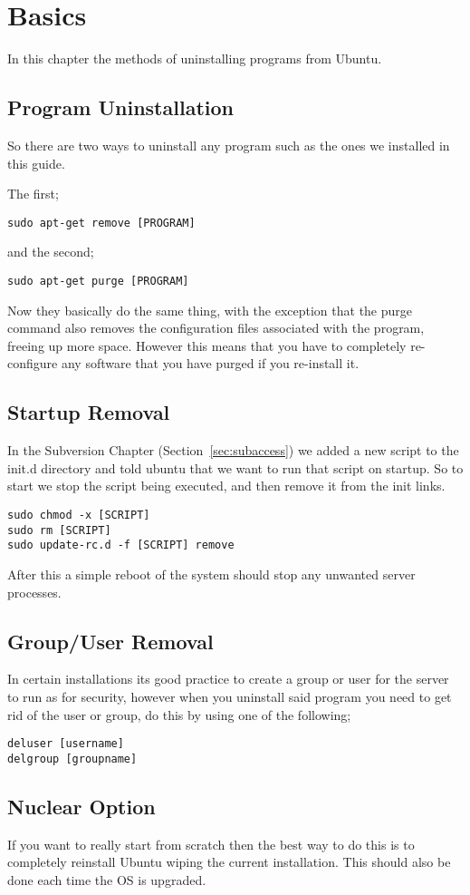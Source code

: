 \chapter{Basics}

In this chapter the methods of uninstalling programs from Ubuntu.

\section{Program Uninstallation}

So there are two ways to uninstall any program such as the ones we installed in this guide.

The first;
\begin{lstlisting}
sudo apt-get remove [PROGRAM]
\end{lstlisting}

and the second;
\begin{lstlisting}
sudo apt-get purge [PROGRAM]
\end{lstlisting}

Now they basically do the same thing, with the exception that the purge command also removes the configuration files associated with the program, freeing up more space.  However this means that you have to completely re-configure any software that you have purged if you re-install it.

\section{Startup Removal}

In the Subversion Chapter (Section~\ref{sec:subaccess}) we added a new script to the init.d directory and told ubuntu that we want to run that script on startup.  So to start we stop the script being executed, and then remove it from the init links.

\begin{lstlisting}
sudo chmod -x [SCRIPT]
sudo rm [SCRIPT]
sudo update-rc.d -f [SCRIPT] remove
\end{lstlisting}

After this a simple reboot of the system should stop any unwanted server processes.

\section{Group/User Removal}

In certain installations its good practice to create a group or user for the server to run as for security, however when you uninstall said program you need to get rid of the user or group, do this by using one of the following;

\begin{lstlisting}
deluser [username]
delgroup [groupname]
\end{lstlisting}

\section{Nuclear Option}

If you want to really start from scratch then the best way to do this is to completely reinstall Ubuntu wiping the current installation. This should also be done each time the OS is upgraded.